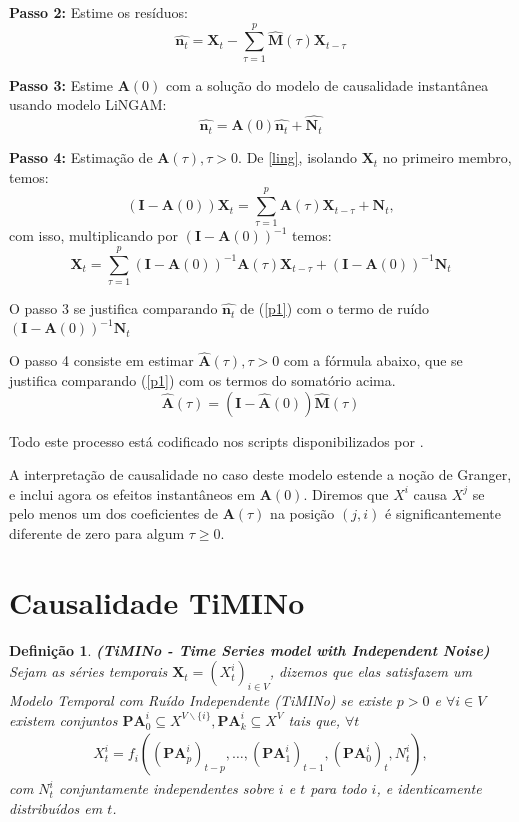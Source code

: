 \documentclass[12pt,letterpaper]{article}
\newtheorem{defi}{Definição}
\newcommand{\bd}[1]{\boldsymbol{#1}}
\begin{document}
	\textbf{Passo 2:} Estime os resíduos:
	$$\hat{\bd n_t}=\bd X_t-\sum_{\tau=1}^{p}\hat{\bd M}(\tau)\bd X_{t-\tau}$$
	
	\textbf{Passo 3:} Estime $\bd A(0)$ com a solução do modelo de causalidade instantânea usando modelo LiNGAM:
	$$\hat{\bd n_t}=\bd A(0)\hat{\bd n_t}+\hat{\bd N_t}$$
	
	\textbf{Passo 4:} Estimação de $\bd A(\tau),\tau>0$. De \ref{ling}, isolando $\bd X_t$ no primeiro membro, temos:
	$$(\bd I-\bd A(0))\bd X_t=\sum_{\tau=1}^{p}\bd A(\tau)\bd X_{t-\tau}+\bd N_t,$$
	com isso, multiplicando por $(\bd I-\bd A(0))^{-1}$ temos:
	$$\bd X_t=\sum_{\tau=1}^p(\bd I-\bd A(0))^{-1}\bd A(\tau)\bd X_{t-\tau}+(\bd I-\bd A(0))^{-1}\bd N_t$$
	
	O passo 3 se justifica comparando $\hat{\bd n_t}$ de (\ref{p1}) com o termo de ruído $(\bd I-\bd A(0))^{-1}\bd N_t$
	
	O passo 4 consiste em estimar $\hat{\bd A}(\tau),\tau>0$ com a fórmula abaixo, que se justifica comparando (\ref{p1}) com os termos do somatório acima.
	$$\hat{\bd A}(\tau)=(\bd I-\hat{\bd A}(0))\hat{\bd M}(\tau)$$
	
	Todo este processo está codificado nos scripts disponibilizados por \cite{tsling2}. 
	
	A interpretação de causalidade no caso deste modelo estende a noção de Granger, e inclui agora os efeitos instantâneos em $\bd A (0)$. Diremos que $X^i$ causa $X^j$ se pelo menos um dos coeficientes de $\bd A(\tau)$ na posição $(j,i)$ é significantemente diferente de zero para algum $\tau\geq 0$.
	
	\section{Causalidade TiMINo}
	\begin{defi}\cite{Peters2012phd} \textbf{(TiMINo - Time Series model with Independent Noise)} Sejam as séries temporais $\bd X_t=(X^i_t)_{i\in V}$, dizemos que elas satisfazem um Modelo Temporal com Ruído Independente (TiMINo) se existe $p>0$ e $\forall i \in V$ existem conjuntos $\bd{PA}^i_0\subseteq X^{V\backslash \{i\}},\bd{PA}^{i}_{k}\subseteq X^{V}$ tais que, $\forall t$
		\begin{align}\label{timino}
			X^i_t=f_i((\bd{PA}^i_p)_{t-p},\ldots,(\bd{PA}^i_1)_{t-1},(\bd{PA}^i_0)_ t,N^i_t),
		\end{align}
	com $N^i_t$ conjuntamente independentes sobre $i$ e $t$ para todo $i$, e identicamente distribuídos em $t$.\end{defi}
	
\end{document}
